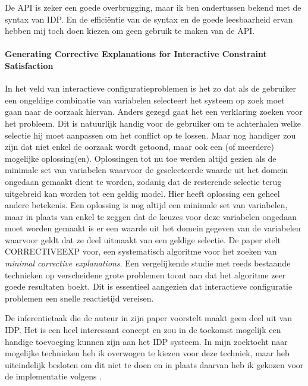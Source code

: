 De API is zeker een goede overbrugging, maar ik ben ondertussen bekend met de syntax van IDP. En de effici\"{e}ntie van de syntax en de goede leesbaarheid ervan hebben mij toch doen kiezen om geen gebruik te maken van de API. 

\paragraph{Generating Corrective Explanations for Interactive Constraint Satisfaction \cite{o2005generating}}
In het veld van interactieve configuratieproblemen is het zo dat als de gebruiker een ongeldige combinatie van variabelen selecteert het systeem op zoek moet gaan naar de oorzaak hiervan. Anders gezegd gaat het een verklaring zoeken voor het probleem. Dit is natuurlijk handig voor de gebruiker om te achterhalen welke selectie hij moet aanpassen om het conflict op te lossen. Maar nog handiger zou zijn dat niet enkel de oorzaak wordt getoond, maar ook een (of meerdere) mogelijke oplossing(en). Oplossingen tot nu toe werden altijd gezien als de minimale set van variabelen waarvoor de geselecteerde waarde uit het domein ongedaan gemaakt dient te worden, zodanig dat de resterende selectie terug uitgebreid kan worden tot een geldig model. Hier heeft oplossing een geheel andere betekenis. Een oplossing is nog altijd een minimale set van variabelen, maar in plaats van enkel te zeggen dat de keuzes voor deze variabelen ongedaan moet worden gemaakt is er een waarde uit het domein gegeven van de variabelen waarvoor geldt dat ze deel uitmaakt van een geldige selectie. De paper stelt CORRECTIVEEXP voor, een systematisch algoritme voor het zoeken van \emph{minimal corrective explanations}. Een vergelijkende studie met reeds bestaande technieken op verscheidene grote problemen toont aan dat het algoritme zeer goede resultaten boekt. Dit is essentieel aangezien dat interactieve configuratie problemen een snelle reactietijd vereisen.

De inferentietaak die de auteur in zijn paper voorstelt maakt geen deel uit van IDP. Het is een heel interessant concept en zou in de toekomst mogelijk een handige toevoeging kunnen zijn aan het IDP systeem. In mijn zoektocht naar mogelijke technieken heb ik overwogen te kiezen voor deze techniek, maar heb uiteindelijk besloten om dit niet te doen en in plaats daarvan heb ik gekozen voor de implementatie volgens \citep{amilhastre2002consistency}.
